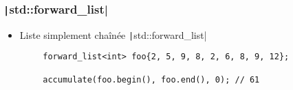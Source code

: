 \documentclass[C++.tex]{subfiles}
\begin{document}
\begin{frame}[fragile]
\frametitle{\texttt|std::forward_list|}
	\begin{itemize}
		\item Liste simplement chaînée \texttt|std::forward_list|
	\end{itemize}

	\begin{verbatim}
		forward_list<int> foo{2, 5, 9, 8, 2, 6, 8, 9, 12};

		accumulate(foo.begin(), foo.end(), 0); // 61
	\end{verbatim}

\end{frame}
\end{document}
